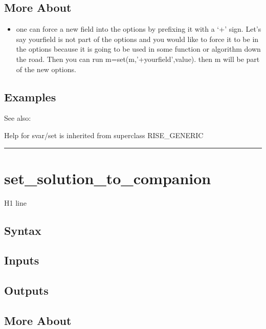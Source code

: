 \documentclass[letterpaper,10pt,english]{sphinxmanual}
\begin{document}
\subsection{More About}
\label{classes/models/@svar/svar:id107}\begin{itemize}
\item {} 
one can force a new field into the options by prefixing it with a `+'
sign. Let's say yourfield is not part of the options and you would like
to force it to be in the options because it is going to be used in some
function or algorithm down the road. Then you can run
m=set(m,'+yourfield',value). then m will be part of the new options.

\end{itemize}


\subsection{Examples}
\label{classes/models/@svar/svar:id108}
See also:

Help for svar/set is inherited from superclass RISE\_GENERIC


\bigskip\hrule{}\bigskip



\section{set\_solution\_to\_companion}
\label{classes/models/@svar/svar:id109}\label{classes/models/@svar/svar:set-solution-to-companion}
H1 line


\subsection{Syntax}
\label{classes/models/@svar/svar:id110}

\subsection{Inputs}
\label{classes/models/@svar/svar:id111}

\subsection{Outputs}
\label{classes/models/@svar/svar:id112}

\subsection{More About}
\label{classes/models/@svar/svar:id113}
\end{document}
